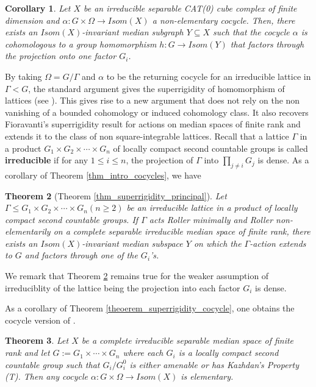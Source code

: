 \documentclass{amsart}
\numberwithin{equation}{section}
\newtheorem{theorem}{Theorem}
\newtheorem{corollary}[theorem]{Corollary}
\theoremstyle{definition}
\begin{document}
 \begin{corollary}
    Let $X$ be an irreducible separable CAT(0) cube complex of finite dimension and $\alpha:G\times \Omega \rightarrow Isom(X)$ a non-elementary cocycle. 
 Then, there exists an $Isom(X)$-invariant median subgraph $Y\subseteq X$ such that the cocycle $\alpha$ is cohomologous to a group homomorphism $h:G\rightarrow Isom(Y)$ that factors through the projection onto one factor $G_i$. 
 \end{corollary}


By taking $\Omega = G/\Gamma$ and $\alpha$ to be the returning cocycle for an irreducible lattice in $\Gamma< G$, the standard argument gives the superrigidity of homomorphism of lattices (see \cite{Furstenberg-Bourbaki}). This gives rise to a new argument that does not rely on the non vanishing of a bounded cohomology or induced cohomology class. It also recovers Fioravanti's superrigidity result for actions on median spaces of finite rank \cite{Fior_superrigidity} and extends it to the class of non square-integrable lattices. Recall that a lattice $\Gamma$ in a product $G_1\times G_2 \times \cdots \times G_n$ of locally compact second countable groups is called \textbf{irreducible} if for any $1 \leq i \leq n$, the projection of $\Gamma$ into $\prod_{j \neq i}G_j$ is dense. As a corollary of Theorem \ref{thm_intro_cocycles}, we have 
 \begin{theorem}[Theorem \ref{thm_superrigidity_principal}]\label{thm_intro_homo}
 Let $\Gamma\leq G_1\times G_2 \times \cdots \times G_n (n \geq 2)$ be an irreducible lattice in a product of locally compact second countable groups. If $\Gamma$ acts Roller minimally and Roller non-elementarily on a complete separable irreducible median space of finite rank, there exists an $Isom(X)$-invariant median subspace $Y$ on which the $\Gamma$-action extends to $G$ and factors through one of the $G_i$'s.
 \end{theorem}

 
We remark that Theorem \ref{thm_intro_homo} remains true for the weaker assumption of irreduciblity of the lattice being the projection into each factor $G_i$ is dense. \par
 As a corollary of Theorem \ref{theoerem_superrigidity_cocycle}, one obtains the cocycle version of \cite[Theorem C]{Fior_superrigidity}. 
\begin{theorem}\label{thm_elementary_cocycyle_product_group}
    Let $X$ be a complete irreducible separable median space of finite rank and let $G:=G_1\times \cdots \times G_n$ where each $G_i$ is a locally compact second countable group such that $G_i/G_i^0$ is either amenable or has Kazhdan's Property (T). Then any cocycle $\alpha:G\times \Omega\rightarrow Isom(X)$ is elementary.
\end{theorem}
 
\end{document}

